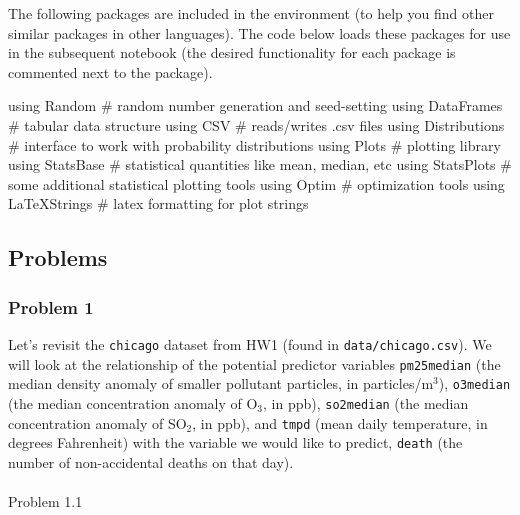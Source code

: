 \documentclass[
  letterpaper,
  DIV=11,
  numbers=noendperiod]{scrartcl}
\makeatletter
\let\oldparagraph\paragraph
\renewcommand{\paragraph}{
    \@ifstar
      \xxxParagraphStar
      \xxxParagraphNoStar
  }
\newcommand{\xxxParagraphStar}[1]{\oldparagraph*{#1}\mbox{}}
\newcommand{\xxxParagraphNoStar}[1]{\oldparagraph{#1}\mbox{}}
\newenvironment{Shaded}{\begin{snugshade}}{\end{snugshade}}
\newcommand{\BuiltInTok}[1]{\textcolor[rgb]{0.00,0.23,0.31}{#1}}
\newcommand{\CommentTok}[1]{\textcolor[rgb]{0.37,0.37,0.37}{#1}}
\newcommand{\ImportTok}[1]{\textcolor[rgb]{0.00,0.46,0.62}{#1}}
\makeatother
\begin{document}
The following packages are included in the environment (to help you find
other similar packages in other languages). The code below loads these
packages for use in the subsequent notebook (the desired functionality
for each package is commented next to the package).

\begin{Shaded}
\begin{Highlighting}[]
\ImportTok{using} \BuiltInTok{Random} \CommentTok{\# random number generation and seed{-}setting}
\ImportTok{using} \BuiltInTok{DataFrames} \CommentTok{\# tabular data structure}
\ImportTok{using} \BuiltInTok{CSV} \CommentTok{\# reads/writes .csv files}
\ImportTok{using} \BuiltInTok{Distributions} \CommentTok{\# interface to work with probability distributions}
\ImportTok{using} \BuiltInTok{Plots} \CommentTok{\# plotting library}
\ImportTok{using} \BuiltInTok{StatsBase} \CommentTok{\# statistical quantities like mean, median, etc}
\ImportTok{using} \BuiltInTok{StatsPlots} \CommentTok{\# some additional statistical plotting tools}
\ImportTok{using} \BuiltInTok{Optim} \CommentTok{\# optimization tools}
\ImportTok{using} \BuiltInTok{LaTeXStrings} \CommentTok{\# latex formatting for plot strings}
\end{Highlighting}
\end{Shaded}

\subsection{Problems}\label{problems}

\subsubsection{Problem 1}\label{problem-1}

Let's revisit the \texttt{chicago} dataset from HW1 (found in
\texttt{data/chicago.csv}). We will look at the relationship of the
potential predictor variables \texttt{pm25median} (the median density
anomaly of smaller pollutant particles, in particles/m\(^3\)),
\texttt{o3median} (the median concentration anomaly of O\(_3\), in ppb),
\texttt{so2median} (the median concentration anomaly of SO\(_2\), in
ppb), and \texttt{tmpd} (mean daily temperature, in degrees Fahrenheit)
with the variable we would like to predict, \texttt{death} (the number
of non-accidental deaths on that day).

\paragraph{Problem 1.1}\label{problem-1.1}
\end{document}
